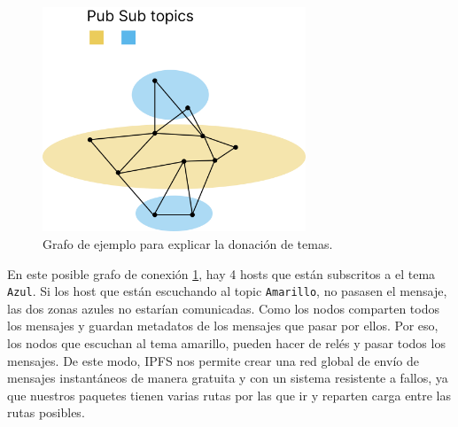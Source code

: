 \begin{figure}[h!]
    \centering
    \includegraphics[width=0.7\textwidth]{Figures/Zonas multiples.png}
    \caption{Grafo de ejemplo para explicar la donación de temas.}
    \label{fg:zonas_multiples}
\end{figure}
En este posible grafo de conexión \ref{fg:zonas_multiples}, hay 4 hosts que están subscritos a el tema \verb|Azul|. Si los host que están escuchando al topic \verb|Amarillo|, no pasasen el mensaje, las dos zonas azules no estarían comunicadas.
Como los nodos comparten todos los mensajes y guardan metadatos de los mensajes que pasar por ellos. Por eso, los nodos que escuchan al tema amarillo, pueden hacer de relés y pasar todos los mensajes.
De este modo, IPFS \cite{web:ipfs} nos permite crear una red global de envío de mensajes instantáneos de manera gratuita y con un sistema resistente a fallos, ya que nuestros paquetes tienen varias rutas por las que ir y reparten carga entre las rutas posibles.
